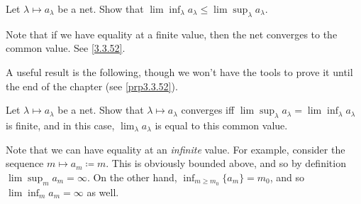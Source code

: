 \begin{exr}\label{exr3.3.50}
Let $\lambda \mapsto a_\lambda$ be a net.  Show that $\lim \inf _\lambda a_\lambda \leq \lim \sup _\lambda a_\lambda$.
\begin{rmk}
Note that if we have equality at a finite value, then the net converges to the common value.  See \eqref{3.3.52}.
\end{rmk}
\end{exr}
A useful result is the following, though we won't have the tools to prove it until the end of the chapter (see \cref{prp3.3.52}).
\begin{textequation}[3.3.52]
Let $\lambda \mapsto a_\lambda$ be a net.  Show that $\lambda \mapsto a_\lambda$ converges iff $\lim \sup _\lambda a_\lambda =\lim \inf _\lambda a_\lambda$ is finite, and in this case, $\lim _\lambda a_\lambda$ is equal to this common value.
\end{textequation}
\begin{exm}
Note that we can have equality at an \emph{infinite} value.  For example, consider the sequence $m\mapsto a_m\coloneqq m$.  This is obviously bounded above, and so by definition $\lim \sup _ma_m=\infty$.  On the other hand, $\inf _{m\geq m_0}\{ a_m\} =m_0$, and so $\lim \inf _ma_m=\infty$ as well.
\end{exm}

\horizontalrule

